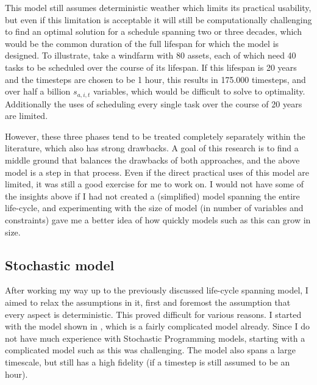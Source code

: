 \documentclass[a4paper,12pt]{article}
\begin{document}
This model still assumes deterministic weather which limits its practical usability, but even if this limitation is acceptable it will still be computationally challenging to find an optimal solution for a schedule spanning two or three decades, which would be the common duration of the full lifespan for which the model is designed. To illustrate, take a windfarm with 80 assets, each of which need 40 tasks to be scheduled over the course of its lifespan. If this lifespan is 20 years and the timesteps are chosen to be 1 hour, this results in 175.000 timesteps, and over half a billion $s_{a,i,t}$ variables, which would be difficult to solve to optimality. Additionally the uses of scheduling every single task over the course of 20 years are limited. 

However, these three phases tend to be treated completely separately within the literature, which also has strong drawbacks. A goal of this research is to find a middle ground that balances the drawbacks of both approaches, and the above model is a step in that process. Even if the direct practical uses of this model are limited, it was still a good exercise for me to work on. I would not have some of the insights above if I had not created a (simplified) model spanning the entire life-cycle, and experimenting with the size of model (in number of variables and constraints) gave me a better idea of how quickly models such as this can grow in size. 

\subsection{Stochastic model}
After working my way up to the previously discussed life-cycle spanning model, I aimed to relax the assumptions in it, first and foremost the assumption that every aspect is deterministic. This proved difficult for various reasons. I started with the model shown in , which is a fairly complicated model already. Since I do not have much experience with Stochastic Programming models, starting with a complicated model such as this was challenging. The model also spans a large timescale, but still has a high fidelity (if a timestep is still assumed to be an hour). 
\end{document}
